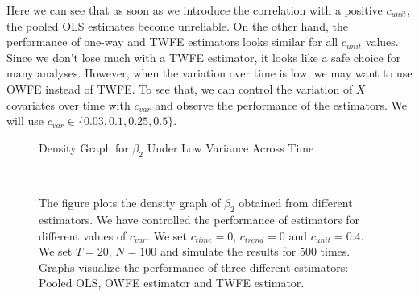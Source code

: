 \documentclass[12pt, a4paper]{article}
\begin{document}
Here we can see that as soon as we introduce the correlation with a positive
 $c_{unit}$, the pooled OLS estimates become unreliable. On the other hand,
 the performance of one-way and  TWFE estimators looks similar
 for all $c_{unit}$ values. Since we don't lose much with a  TWFE
 estimator, it looks like a safe choice for many analyses. However, when the
 variation over time is low, we may want to use OWFE instead of  TWFE.
 To see that, we can control the variation of $X$ covariates over time with $c_{var}$ and
 observe the performance of the estimators. We will use $c_{var} \in \{0.03, 0.1, 0.25, 0.5\}$.
\begin{figure}[htbp]
    \caption{Density Graph for $\beta_2$ Under Low Variance Across Time}
     \\
    \caption*{\scriptsize{The figure plots the density graph of $\beta_2$
    obtained from different estimators. We have controlled the performance of
    estimators for different values of $c_{var}$. We set $c_{time} = 0$, $c_{trend} = 0$
    and $c_{unit} = 0.4$. We set $T = 20$, $N = 100$ and simulate the results
    for $500$ times. Graphs visualize the performance
    of three different estimators: Pooled OLS, OWFE estimator and  TWFE estimator.
    }}
    \label{fig:c2}
\end{figure}
\end{document}
